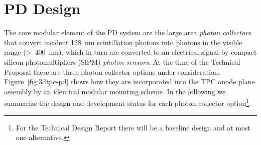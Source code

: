 \section{PD Design}
\label{sec:fdsp-pd-design}



The core modular element of the PD system are the large area {\it photon collectors} that convert incident \SI{128}{nm} scintillation photons into photons in the visible range (>~\SI{400}{nm}), which in turn are converted to an electrical signal by compact silicon photomultipliers (SiPM) {\it photon sensors}. At the time of the Technical Proposal there are three photon collector options under consideration; Figure~\ref{fig:3dtpc-pd} shows how they are incorporated into the TPC anode plane assembly by an identical modular mounting scheme. In the following we summarize the design and development status for each photon collector option\footnote{For the Technical Design Report there will be a baseline design and at most one alternative.}.



%

